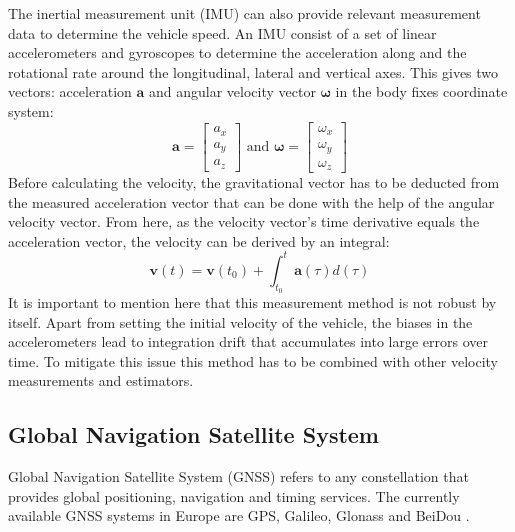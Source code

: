 The inertial measurement unit (IMU) can also provide relevant measurement data to determine the vehicle speed. An IMU consist of a set of linear accelerometers and gyroscopes to determine the acceleration along and the rotational rate around the longitudinal, lateral and vertical axes. This gives two vectors: acceleration $\textbf{a}$ and angular velocity vector $\boldsymbol{\omega}$ in the body fixes coordinate system:
\begin{equation}
    \textbf{a} = \begin{bmatrix}
        a_x \\ a_y \\ a_z 
    \end{bmatrix}
    \text{ and }
    \boldsymbol{\omega} = 
    \begin{bmatrix}
        \omega_x \\ \omega_y \\ \omega_z
    \end{bmatrix}
\end{equation}
Before calculating the velocity, the gravitational vector has to be deducted from the measured acceleration vector that can be done with the help of the angular velocity vector. From here, as the velocity vector's time derivative equals the acceleration vector, the velocity can be derived by an integral:
\begin{equation}
    \textbf{v}(t) = \textbf{v}(t_0) + \int_{t_0}^{t} \textbf{a}(\tau) d(\tau)
\end{equation}
It is important to mention here that this measurement method is not robust by itself. Apart from setting the initial velocity of the vehicle, the biases in the accelerometers lead to integration drift that accumulates into large errors over time. To mitigate this issue this method has to be combined with other velocity measurements and estimators.

\subsection{Global Navigation Satellite System}
\label{subsec:GNSS}

Global Navigation Satellite System (GNSS) refers to any constellation that provides global positioning, navigation and timing services. The currently available GNSS systems in Europe are GPS, Galileo, Glonass and BeiDou \cite{GNSS}. 

